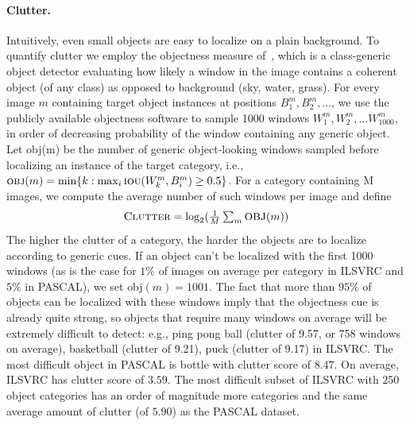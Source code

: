 \begin{appendices}
\paragraph{Clutter.} Intuitively, even small objects are easy to localize on a plain background. To quantify clutter we employ the objectness measure of~\citep{Alexe12}, which is a class-generic object detector evaluating how likely a window in the image contains a coherent object (of any class) as opposed to background (sky, water, grass). For every image $m$ containing target object instances at positions $B_1^m,B_2^m,\dots$, we use the publicly available objectness software to sample 1000 windows $W_1^m,W_2^m,\dots W_{1000}^m$, in order of decreasing probability of the window containing any generic object. Let {\sc obj}(m) be the number of generic object-looking windows sampled before localizing an instance of the target category, i.e., $\mbox{\sc obj}(m) = \min \{k: \max_i \mbox{\sc iou}(W_k^m,B_i^m) \geq 0.5\}$. For a category containing M images, we compute the average number of such windows per image and define
\begin{equation}
\label{cluttereq}
\textstyle
\mbox{\sc Clutter} = \log_{2} \large ( \frac{1}{M}\sum_m \mbox{\sc obj}(m) \large )
\end{equation}
The higher the clutter of a category, the harder the objects are to localize according to generic cues. If an object can't be localized with the first 1000 windows (as is the case for $1\%$ of images on average per category in ILSVRC and $5\%$ in PASCAL), we set {\sc obj}$(m)=1001$. The fact that more than $95\%$ of objects can be localized with these windows imply that the objectness cue is already quite strong, so objects that require many windows on average will be extremely difficult to detect: e.g., ping pong ball (clutter of 9.57, or 758 windows on average), basketball (clutter of 9.21), puck (clutter of 9.17) in ILSVRC. The most difficult object in PASCAL is bottle with clutter score of $8.47$.  On average, ILSVRC has clutter score of $3.59$. The most difficult subset of ILSVRC with 250 object categories has an order of magnitude more categories and the same average amount of clutter (of $5.90$) as the PASCAL dataset. 


\end{appendices}
